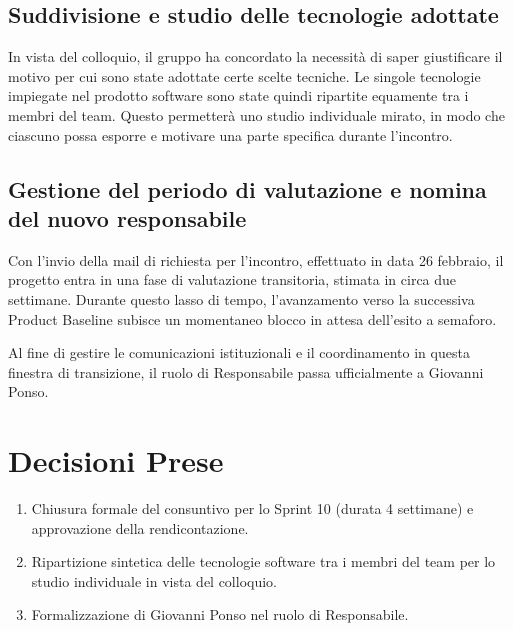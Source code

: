 \documentclass[a4paper, 11pt, oneside]{scrartcl}
\begin{document}
\subsection{Suddivisione e studio delle tecnologie adottate}

In vista del colloquio, il gruppo ha concordato la necessità di saper giustificare il motivo per cui sono state adottate certe scelte tecniche. Le singole tecnologie impiegate nel prodotto software sono state quindi ripartite equamente tra i membri del team. Questo permetterà uno studio individuale mirato, in modo che ciascuno possa esporre e motivare una parte specifica durante l'incontro.

\subsection{Gestione del periodo di valutazione e nomina del nuovo responsabile}

Con l'invio della mail di richiesta per l'incontro, effettuato in data 26 febbraio, il progetto entra in una fase di valutazione transitoria, stimata in circa due settimane. Durante questo lasso di tempo, l'avanzamento verso la successiva Product Baseline subisce un momentaneo blocco in attesa dell'esito a semaforo.

Al fine di gestire le comunicazioni istituzionali e il coordinamento in questa finestra di transizione, il ruolo di Responsabile passa ufficialmente a Giovanni Ponso.


\newpage
\section{Decisioni Prese}

\begin{enumerate}
\item Chiusura formale del consuntivo per lo Sprint 10 (durata 4 settimane) e approvazione della rendicontazione.
\item Ripartizione sintetica delle tecnologie software tra i membri del team per lo studio individuale in vista del colloquio.
\item Formalizzazione di Giovanni Ponso nel ruolo di Responsabile.
\end{enumerate}

\end{document}
